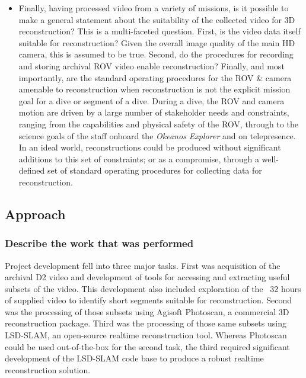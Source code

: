\documentclass[letterpaper,12pt]{article}
\begin{document}
\begin{itemize}
    \item Finally, having processed video from a variety of missions, is it possible to make a general statement about the suitability of the collected video for 3D reconstruction?  This is a multi-faceted question.  First, is the video data itself suitable for reconstruction?  Given the overall image quality of the main HD camera, this is assumed to be true.  Second, do the procedures for recording and storing archival ROV video enable reconstruction?   Finally, and most importantly, are the standard operating procedures for the ROV \& camera amenable to reconstruction when reconstruction is not the explicit mission goal for a dive or segment of a dive.  During a dive, the ROV and camera motion are driven by a large number of stakeholder needs and constraints, ranging from the capabilities and physical safety of the ROV, through to the science goals of the staff onboard the \textit{Okeanos Explorer} and on telepresence.  In an ideal world, reconstructions could be produced without significant additions to this set of constraints; or as a compromise, through a well-defined set of standard operating procedures for collecting data for reconstruction.  
    
\end{itemize}



\subsection{Approach}
\subsubsection{Describe the work that was performed}

Project development fell into three major tasks.  First was acquisition of the archival D2 video and development of tools for accessing and extracting useful subsets of the video.  This development also included exploration of the ~32 hours of supplied video to identify short segments suitable for reconstruction.   Second was the processing of those subsets using Agisoft Photoscan, a commercial 3D reconstruction package.   Third was the processing of those same subsets using LSD-SLAM, an open-source realtime reconstruction tool.  Whereas Photoscan could be used out-of-the-box for the second task, the third required significant development of the LSD-SLAM code base to produce a robust realtime reconstruction solution.  
\end{document}
